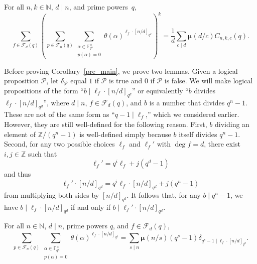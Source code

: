 \documentclass[Unicode,ALCO]{cedram}
\newcommand{\F}{\mathbb{F}}
\newcommand{\CF}{\mathcal{F}}
\newcommand{\N}{\mathbb{N}}
\newcommand{\CP}{\mathcal{P}}
\newcommand{\Z}{\mathbb{Z}}
\newcommand{\moebius}{\pmb{\mu}}
\newcommand{\te}{\theta}
\begin{document}
\begin{corollary}
\label{pre_main}
For all \(n,k \in \N, \, d \mid n\), and prime powers~\(q\),
\[
\sum_{f \in \CF_d (q)}
\left (
\sum_{p \in \CF_n (q)}
\sum_{\substack{\alpha \in \F_{q^n}^\times \\ p(\alpha) = 0}}
\te(\alpha)^{\ell_f \cdot [n/d]_{q^d}}
\right )^k
=
\frac{1}{d} \sum_{c \mid d} \moebius(d/c) C_{n,k,c}(q).
\]
\end{corollary}




Before proving Corollary~\ref{pre_main}, we prove two lemmas.
Given a logical proposition \(\CP\), let \(\delta_\CP\) equal \(1\) if \(\CP\) is true and \(0\) if \(\CP\) is false.
We will make logical propositions of the form ``\(b \mid \ell_f \cdot [n/d]_{q^d}\)'' or equivalently ``\(b\) divides \(\ell_f \cdot [n/d]_{q^d}\)'', where \(d \mid n\), \(f \in \CF_d (q)\), and \(b\) is a number that divides \(q^n-1\).
These are not of the same form as ``\(q-1 \mid \ell_f\),'' which we considered earlier.
However, they are still well-defined for the following reason.
First, \(b\) dividing an element of \(\Z / (q^n-1)\) is well-defined simply because \(b\) itself divides \(q^n-1\).
Second, for any two possible choices \(\ell_f\) and \(\ell_f'\) with \(\deg f = d\), there exist \(i,j \in \Z\) such that
\begin{equation}
\label{well_defined_div}
\ell_f' = q^i \ell_f + j(q^d-1)
\end{equation}
and thus
\begin{equation}
\ell_f' \cdot [n/d]_{q^d} = q^i \ell_f \cdot [n/d]_{q^d} + j (q^n-1)
\end{equation}
from multiplying both sides by \([n/d]_{q^d}\).
It follows that, for any \(b \mid q^n-1\), we have
\(b \mid \ell_f \cdot [n/d]_{q^d}\)
if and only if
\(b \mid \ell_f' \cdot [n/d]_{q^d}\).



\begin{lemma}
\label{pre_pre_main}
For all \(n \in \N\), \(d \mid n\), prime powers \(q\), and \(f \in \CF_d (q)\),
\begin{equation}
\sum_{p \in \CF_n (q)}
\sum_{\substack{\alpha \in \F_{q^n}^\times \\ p(\alpha) = 0}}
\te(\alpha)^{\ell_f \cdot [n/d]_{q^d}}
=
\sum_{s \mid n} \moebius(n/s) (q^s-1) \delta_{q^s - 1 \mid \ell_f \cdot [n/d]_{q^d}}.
\end{equation}
\end{lemma}
\end{document}
